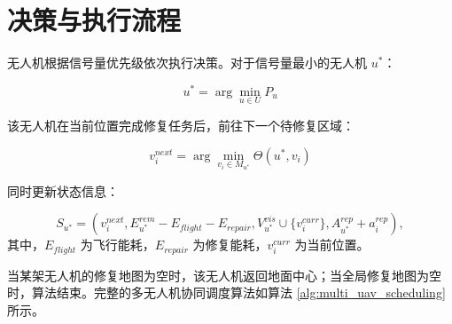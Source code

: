 \section{决策与执行流程}

无人机根据信号量优先级依次执行决策。对于信号量最小的无人机 $u^*$：

\begin{equation}
	u^* = \arg\min_{u \in U} P_u
\end{equation}

该无人机在当前位置完成修复任务后，前往下一个待修复区域：

\begin{equation}
	v_i^{next} = \arg\min_{v_i \in M_{u^*}} \Theta(u^*,v_i)
\end{equation}

同时更新状态信息：

\begin{equation}
	S_{u^*} = (v_i^{next}, E_{u^*}^{rem} - E_{flight} - E_{repair}, V_{u^*}^{vis} \cup \{v_i^{curr}\}, A_{u^*}^{rep} + a_i^{rep}),
\end{equation}
其中，$E_{flight}$ 为飞行能耗，$E_{repair}$ 为修复能耗，$v_i^{curr}$ 为当前位置。

当某架无人机的修复地图为空时，该无人机返回地面中心；当全局修复地图为空时，算法结束。完整的多无人机协同调度算法如算法 \ref{alg:multi_uav_scheduling} 所示。

